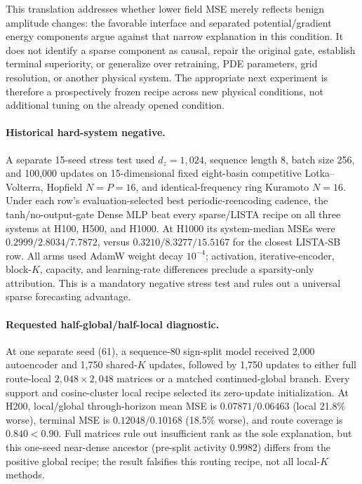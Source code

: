 This translation addresses whether lower field MSE merely reflects benign
amplitude changes: the favorable interface and separated potential/gradient
energy components argue against that narrow explanation in this condition.
It does not identify a sparse component as causal, repair the original gate,
establish terminal superiority, or generalize over retraining, PDE parameters,
grid resolution, or another physical system. The appropriate next experiment
is therefore a prospectively frozen recipe across new physical conditions,
not additional tuning on the already opened condition.

\paragraph{Historical hard-system negative.}
A separate 15-seed stress test used $d_z=1{,}024$, sequence length 8, batch
size 256, and 100,000 updates on 15-dimensional fixed eight-basin competitive
Lotka--Volterra, Hopfield $N=P=16$, and identical-frequency ring Kuramoto
$N=16$. Under each row's evaluation-selected best periodic-reencoding
cadence, the tanh/no-output-gate Dense MLP beat every sparse/LISTA recipe on
all three systems at H100, H500, and H1000. At H1000 its system-median MSEs
were $0.2999/2.8034/7.7872$, versus $0.3210/8.3277/15.5167$ for the closest
LISTA-SB row. All arms used AdamW weight decay $10^{-4}$; activation,
iterative-encoder, block-$K$, capacity, and learning-rate differences preclude
a sparsity-only attribution. This is a mandatory negative stress test and
rules out a universal sparse forecasting advantage.

\paragraph{Requested half-global/half-local diagnostic.}
At one separate seed (61), a sequence-80 sign-split model received 2,000
autoencoder and 1,750 shared-$K$ updates, followed by 1,750 updates to either
full route-local $2{,}048\times2{,}048$ matrices or a matched continued-global
branch. Every support and cosine-cluster local recipe selected its zero-update
initialization. At H200, local/global through-horizon mean MSE is
$0.07871/0.06463$ (local 21.8\% worse), terminal MSE is $0.12048/0.10168$
(18.5\% worse), and route coverage is $0.840<0.90$. Full matrices rule out
insufficient rank as the sole explanation, but this one-seed near-dense
ancestor (pre-split activity $0.9982$) differs from the positive global recipe;
the result falsifies this routing recipe, not all local-$K$ methods.

